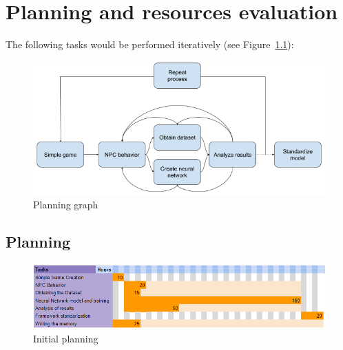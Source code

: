 %
%
%

\chapter{Planning and resources evaluation}

\minitoc{}

\bigskip{}

The following tasks would be performed iteratively (see Figure~\ref{fig:tasks}):

\begin{figure}
  \centering
		\includegraphics[width=.9\textwidth]{img/taskGraph.png}
  \caption{Planning graph}
  \label{fig:tasks}
\end{figure}

\section{Planning}

\begin{figure}
  \centering
		\includegraphics[width=.9\textwidth]{img/ganttChart.png}
  \caption{Initial planning}
  \label{fig:planchart}
\end{figure}


